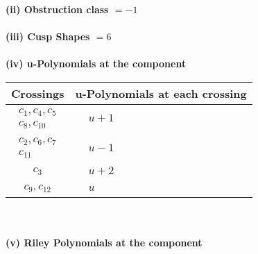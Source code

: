 \documentclass[1p]{elsarticle_modified}
\theoremstyle{definition}
\begin{document}
\flushleft \textbf{(ii) Obstruction class $= -1$}\\~\\
\flushleft \textbf{(iii) Cusp Shapes $= 6$}\\~\\
\newpage\renewcommand{\arraystretch}{1}
\flushleft \textbf{(iv) u-Polynomials at the component}\newline \\
\begin{tabular}{m{50pt}|m{274pt}}
Crossings & \hspace{64pt}u-Polynomials at each crossing \\
\hline $$\begin{aligned}c_{1},c_{4},c_{5}\\c_{8},c_{10}\end{aligned}$$&$\begin{aligned}
&u+1
\end{aligned}$\\
\hline $$\begin{aligned}c_{2},c_{6},c_{7}\\c_{11}\end{aligned}$$&$\begin{aligned}
&u-1
\end{aligned}$\\
\hline $$\begin{aligned}c_{3}\end{aligned}$$&$\begin{aligned}
&u+2
\end{aligned}$\\
\hline $$\begin{aligned}c_{9},c_{12}\end{aligned}$$&$\begin{aligned}
&u
\end{aligned}$\\
\hline
\end{tabular}\\~\\
\newpage\renewcommand{\arraystretch}{1}
\flushleft \textbf{(v) Riley Polynomials at the component}\newline \\
\end{document}
